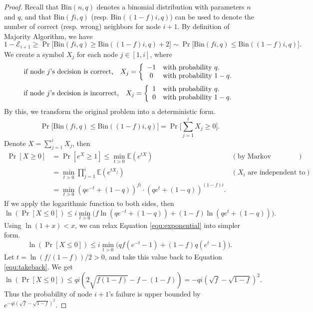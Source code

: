 \documentclass[a4paper,UKenglish]{lipics}
\theoremstyle{definition}
\newcommand\E{\mathbb{E}}
\begin{document}
\begin{proof}
Recall that $\text{Bin}(n,q)$ denotes a binomial distribution with parameters $n$ and $q$,
	and that $\text{Bin}(fi, q)$ (resp. $\text{Bin}((1-f)i, q)$) can be used to denote the number of correct (resp. wrong) neighbors for node $i+1$.
By definition of Majority Algorithm, we have
\begin{equation*}
	1 - \mathcal{E}_{i+1}
\ge
	\Pr\Big[ 
		\text{Bin}(fi, q) \ge \text{Bin}((1-f)i, q) + 2 
	\Big]
\sim
	\Pr \Big[ 
		\text{Bin}(fi, q) \le \text{Bin}((1-f)i, q)
	\Big ].
\end{equation*}
We create a symbol $X_j$ for each node $j \in [1, i]$, where
\begin{equation*}
\text{if node $j$'s decision is correct, }~~
	X_j =
	\left \{
	\begin{array} {c l}
		-1 & \text{with probability $q$.} \\
		0 & \text{with probability $1-q$.}
	\end{array}
	\right.
\end{equation*}
\begin{equation*}
\text{if node $j$'s decision is incorrect, }~~
	X_j =
	\left \{
	\begin{array} {c l}
		1 & \text{with probability $q$.} \\
		0 & \text{with probability $1-q$.}
	\end{array}
	\right.
\end{equation*}
By this, we transform the original problem into a deterministic form.
\begin{equation*}
	\Pr \Big[ 
		\text{Bin}(fi, q) \le \text{Bin}((1-f)i, q)
	\Big]
=
	\Pr\Big[
		\sum_{j=1}^i X_j \ge 0
	\Big].
\end{equation*}
Denote $X = \sum_{j=1}^i X_j$, then
\begin{align*}
	\Pr[X \ge 0]
& =
	\Pr[e^{X} \ge 1 ]
 	\le
	\min_{t>0} \E(e^{tX})
&
	(\text{by Markov Inequality}) \\
&=
	\min_{t>0}\prod_{j = 1}^{i}\E(e^{tX_j})
&
	(\text{$X_i$ are independent to each others}) \\
& =
	\min_{t > 0} (qe^{-t} + (1-q))^{fi}\cdot (qe^{t} + (1-q))^{(1-f)i}.
\end{align*}
If we apply the logarithmic function to both sides, then
\begin{equation}
\label{equ:exponential}
	\ln (\Pr[X \le 0])
\le
	i\min_{t>0} \Big( f \ln(qe^{-t} + (1-q)) + (1-f)\ln (qe^{t} + (1-q)) \Big).
\end{equation}
Using $\ln(1+x) < x$, we can relax Equation \eqref{equ:exponential} into simpler form.
\begin{equation}
\label{equ:takeback}
	\ln (\Pr[X \le 0])
\le
	i\min_{t>0} \Big( qf(e^{-t} - 1) + (1-f)q(e^{t} - 1) \Big).
\end{equation}
Let $t = \ln (f/(1-f)) / 2 > 0$, and take this value back to Equation \eqref{equ:takeback}.
We get
\begin{equation*}
	\ln (\Pr[X \le 0])
\le
	qi (2\sqrt{f(1-f)} - f - (1-f))
=
	-qi(\sqrt{f} - \sqrt{1-f})^2.
\end{equation*}
Thus the probability of node $i+1$'s failure is upper bounded by $e^{-qi(\sqrt{f} - \sqrt{1-f})^2}.$
\end{proof}
\end{document}
